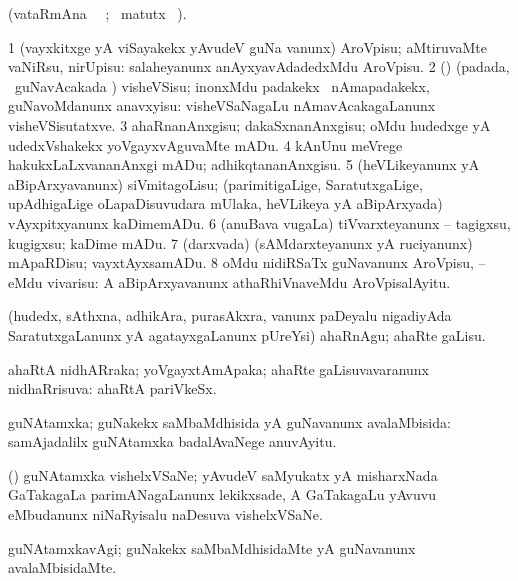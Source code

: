 \bentry
{}
\gl{\kirx}
\bmng
(vataRmAna \parxpu\ \Eva\ ; \BU\ matutx \BUkaq\ ).
\emng

\noindent
\gl{\sakirx}
\bmng
\bnum
\num{1} (vayxkitxge yA viSayakekx yAvudeV guNa \mo vanunx) AroVpisu; aMtiruvaMte vaNiRsu, nirUpisu:  salaheyanunx anAyxyavAdadedxMdu AroVpisu. 
\num{2} (\vAyx) (padada, \kanmu\ guNavAcakada \vi) visheVSisu; inonxMdu padakekx \kanmu\ nAmapadakekx, guNavoMdanunx anavxyisu:  visheVSaNagaLu nAmavAcakagaLanunx visheVSisutatxve. 
\num{3} ahaRnanAnxgisu; dakaSxnanAnxgisu; oMdu hudedxge yA udedxVshakekx yoVgayxvAguvaMte mADu. 
\num{4} kAnUnu meVrege hakukxLaLxvananAnxgi mADu; adhikqtananAnxgisu. 
\num{5} (heVLikeyanunx yA aBipArxyavanunx) siVmitagoLisu; (parimitigaLige, SaratutxgaLige, upAdhigaLige oLapaDisuvudara mUlaka, heVLikeya yA aBipArxyada) vAyxpitxyanunx kaDimemADu. 
\num{6} (anuBava \mo vugaLa) tiVvarxteyanunx -- tagigxsu, kugigxsu; kaDime mADu. 
\num{7} (darxvada) (sAMdarxteyanunx yA ruciyanunx) mApaRDisu; vayxtAyxsamADu. 
\num{8} oMdu nidiRSaTx guNavanunx AroVpisu, -- eMdu vivarisu:  A aBipArxyavanunx athaRhiVnaveMdu AroVpisalAyitu. 
\enum
\emng

\noindent
\gl{\akirx}
\bmng
(hudedx, sAthxna, adhikAra, purasAkxra, \mo vanunx paDeyalu nigadiyAda SaratutxgaLanunx yA agatayxgaLanunx pUreYsi) ahaRnAgu; ahaRte gaLisu. 
\emng
\eentry

\bentry
{}
\gl{\gu}
\bmng
ahaRtA nidhARraka; yoVgayxtAmApaka; ahaRte gaLisuvavaranunx nidhaRrisuva:  ahaRtA pariVkeSx. 
\emng
\eentry

\bentry
{}
\gl{\gu}
\bmng
guNAtamxka; guNakekx saMbaMdhisida yA guNavanunx avalaMbisida:    samAjadalilx guNAtamxka badalAvaNege anuvAyitu. 
\emng
\eentry

\bentry
{}
\gl{\nA}
\bmng
(\ravi) guNAtamxka vishelxVSaNe; yAvudeV saMyukatx yA misharxNada GaTakagaLa parimANagaLanunx lekikxsade, A GaTakagaLu yAvuvu eMbudanunx niNaRyisalu naDesuva vishelxVSaNe. 
\emng
\eentry

\bentry
{}
\gl{\kirxvi}
\bmng
guNAtamxkavAgi; guNakekx saMbaMdhisidaMte yA guNavanunx avalaMbisidaMte. 
\emng
\eentry

